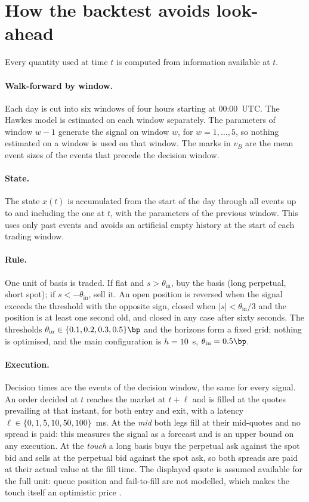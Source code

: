 \documentclass[a4paper,11pt]{article}
\begin{document}
\section{How the backtest avoids look-ahead}

Every quantity used at time $t$ is computed from information available at $t$.

\paragraph{Walk-forward by window.} Each day is cut into six windows of four hours starting at 00:00~UTC. The Hawkes model is estimated on each window separately. The parameters of window $w-1$ generate the signal on window $w$, for $w = 1,\dots,5$, so nothing estimated on a window is used on that window. The marks in $v_B$ are the mean event sizes of the events that precede the decision window.

\paragraph{State.} The state $x(t)$ is accumulated from the start of the day through all events up to and including the one at $t$, with the parameters of the previous window. This uses only past events and avoids an artificial empty history at the start of each trading window.

\paragraph{Rule.} One unit of basis is traded. If flat and $s > \theta_{\mathrm{in}}$, buy the basis (long perpetual, short spot); if $s < -\theta_{\mathrm{in}}$, sell it. An open position is reversed when the signal exceeds the threshold with the opposite sign, closed when $|s| < \theta_{\mathrm{in}}/3$ and the position is at least one second old, and closed in any case after sixty seconds. The thresholds $\theta_{\mathrm{in}} \in \{0.1, 0.2, 0.3, 0.5\}\bp$ and the horizons form a fixed grid; nothing is optimised, and the main configuration is $h = 10$~s, $\theta_{\mathrm{in}} = 0.5\bp$.

\paragraph{Execution.} Decision times are the events of the decision window, the same for every signal. An order decided at $t$ reaches the market at $t + \ell$ and is filled at the quotes prevailing at that instant, for both entry and exit, with a latency $\ell \in \{0, 1, 5, 10, 50, 100\}$~ms. At the \emph{mid} both legs fill at their mid-quotes and no spread is paid: this measures the signal as a forecast and is an upper bound on any execution. At the \emph{touch} a long basis buys the perpetual ask against the spot bid and sells at the perpetual bid against the spot ask, so both spreads are paid at their actual value at the fill time. The displayed quote is assumed available for the full unit: queue position and fail-to-fill are not modelled, which makes the touch itself an optimistic price \cite{albers2025}.
\end{document}
